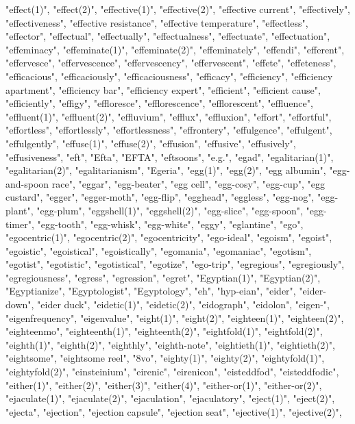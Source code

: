 "effect(1)",
"effect(2)",
"effective(1)",
"effective(2)",
"effective current",
"effectively",
"effectiveness",
"effective resistance",
"effective temperature",
"effectless",
"effector",
"effectual",
"effectually",
"effectualness",
"effectuate",
"effectuation",
"effeminacy",
"effeminate(1)",
"effeminate(2)",
"effeminately",
"effendi",
"efferent",
"effervesce",
"effervescence",
"effervescency",
"effervescent",
"effete",
"effeteness",
"efficacious",
"efficaciously",
"efficaciousness",
"efficacy",
"efficiency",
"efficiency apartment",
"efficiency bar",
"efficiency expert",
"efficient",
"efficient cause",
"efficiently",
"effigy",
"effloresce",
"efflorescence",
"efflorescent",
"effluence",
"effluent(1)",
"effluent(2)",
"effluvium",
"efflux",
"effluxion",
"effort",
"effortful",
"effortless",
"effortlessly",
"effortlessness",
"effrontery",
"effulgence",
"effulgent",
"effulgently",
"effuse(1)",
"effuse(2)",
"effusion",
"effusive",
"effusively",
"effusiveness",
"eft",
"Efta",
"EFTA",
"eftsoons",
"e.g.",
"egad",
"egalitarian(1)",
"egalitarian(2)",
"egalitarianism",
"Egeria",
"egg(1)",
"egg(2)",
"egg albumin",
"egg-and-spoon race",
"eggar",
"egg-beater",
"egg cell",
"egg-cosy",
"egg-cup",
"egg custard",
"egger",
"egger-moth",
"egg-flip",
"egghead",
"eggless",
"egg-nog",
"egg-plant",
"egg-plum",
"eggshell(1)",
"eggshell(2)",
"egg-slice",
"egg-spoon",
"egg-timer",
"egg-tooth",
"egg-whisk",
"egg-white",
"eggy",
"eglantine",
"ego",
"egocentric(1)",
"egocentric(2)",
"egocentricity",
"ego-ideal",
"egoism",
"egoist",
"egoistic",
"egoistical",
"egoistically",
"egomania",
"egomaniac",
"egotism",
"egotist",
"egotistic",
"egotistical",
"egotize",
"ego-trip",
"egregious",
"egregiously",
"egregiousness",
"egress",
"egression",
"egret",
"Egyptian(1)",
"Egyptian(2)",
"Egyptianize",
"Egyptologist",
"Egyptology",
"eh",
"hyp-eian",
"eider",
"eider-down",
"eider duck",
"eidetic(1)",
"eidetic(2)",
"eidograph",
"eidolon",
"eigen-",
"eigenfrequency",
"eigenvalue",
"eight(1)",
"eight(2)",
"eighteen(1)",
"eighteen(2)",
"eighteenmo",
"eighteenth(1)",
"eighteenth(2)",
"eightfold(1)",
"eightfold(2)",
"eighth(1)",
"eighth(2)",
"eighthly",
"eighth-note",
"eightieth(1)",
"eightieth(2)",
"eightsome",
"eightsome reel",
"8vo",
"eighty(1)",
"eighty(2)",
"eightyfold(1)",
"eightyfold(2)",
"einsteinium",
"eirenic",
"eirenicon",
"eisteddfod",
"eisteddfodic",
"either(1)",
"either(2)",
"either(3)",
"either(4)",
"either-or(1)",
"either-or(2)",
"ejaculate(1)",
"ejaculate(2)",
"ejaculation",
"ejaculatory",
"eject(1)",
"eject(2)",
"ejecta",
"ejection",
"ejection capsule",
"ejection seat",
"ejective(1)",
"ejective(2)",
